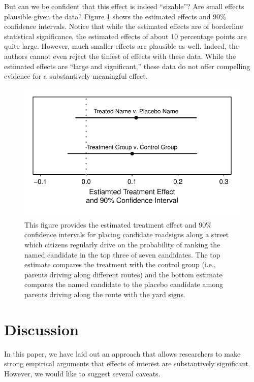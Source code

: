 \documentclass[12pt]{article}
\begin{document}
But can we be confident that this effect is indeed ``sizable''? Are small effects plausible given the data? Figure \ref{fig:kz-ci} shows the estimated effects and 90\% confidence intervals. Notice that while the estimated effects are of borderline statistical significance, the estimated effects of about 10 percentage points are quite large. However, much smaller effects are plausible as well. Indeed, the authors cannot even reject the tiniest of effects with these data. While the estimated effects are ``large and significant,'' these data do not offer compelling evidence for a substantively meaningful effect.

\begin{figure}[H]
\begin{center}
\includegraphics[scale = .8]{figs/kz-ci.pdf}
\caption{This figure provides the estimated treatment effect and 90\% confidence intervals for placing candidate roadsigns along a street which citizens regularly drive on the probability of ranking the named candidate in the top three of seven candidates. The top estimate compares the treatment with the control group (i.e., parents driving along different routes) and the bottom estimate compares the named candidate to the placebo candidate among parents driving along the route with the yard signs.}\label{fig:kz-ci}
\end{center}
\end{figure}

\section*{Discussion}

In this paper, we have laid out an approach that allows researchers to make strong empirical arguments that effects of interest are substantively significant. However, we would like to suggest several caveats.
\end{document}
